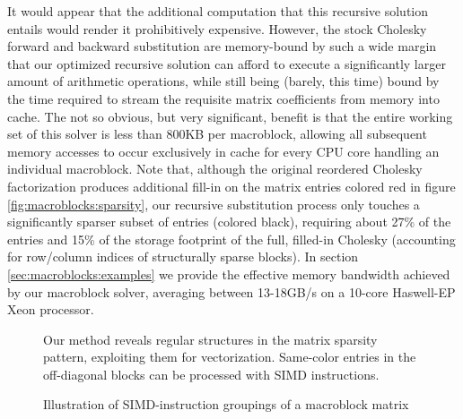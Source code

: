 It would appear that the additional computation that this recursive
solution entails would render it prohibitively expensive. However, the
stock Cholesky forward and backward substitution are memory-bound by
such a wide margin that our optimized recursive solution can afford to
execute a significantly larger amount of arithmetic operations, while
still being (barely, this time) bound by the time required to stream
the requisite matrix coefficients from memory into cache. The not so
obvious, but very significant, benefit is that the entire working set
of this solver is less than 800KB per macroblock, allowing all
subsequent memory accesses to occur exclusively in cache for every CPU
core handling an individual macroblock. Note that, although the
original reordered Cholesky factorization produces additional fill-in
on the matrix entries colored red in figure \ref{fig:macroblocks:sparsity}, our
recursive substitution process only touches a significantly sparser
subset of entries (colored black), requiring about 27\% of the entries
and 15\% of the storage footprint of the full, filled-in Cholesky
(accounting for row/column indices of structurally sparse blocks). In
section \ref{sec:macroblocks:examples} we provide the effective memory bandwidth
achieved by our macroblock solver, averaging between 13-18GB/s on a
10-core Haswell-EP Xeon processor.

\begin{figure}[h]


\caption{Illustration of SIMD-instruction groupings of a macroblock
  matrix}{Our method reveals regular structures in the matrix sparsity
  pattern, exploiting them for vectorization. Same-color entries in
  the off-diagonal blocks can be processed with SIMD instructions.}
\label{fig:macroblocks:sparsity2}
\end{figure}

